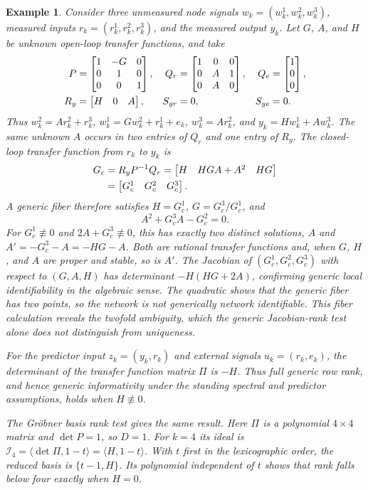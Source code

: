 \documentclass[journal,twoside,web]{ieeecolor}
\newtheorem{exmp}{Example}
\begin{document}
\begin{exmp}\label{ex:groebner-calculation}
%
Consider three unmeasured node signals $w_k=(w_k^1,w_k^2,w_k^3)$,
measured inputs $r_k=(r_k^1,r_k^2,r_k^3)$, and the measured output $y_k$.
Let $G$, $A$, and $H$ be unknown open-loop transfer functions, and take
%
\begin{align*}
P&=\begin{bmatrix} 1&-G&0\\0&1&0\\0&0&1\end{bmatrix}, &
Q_r&=\begin{bmatrix} 1&0&0\\0&A&1\\0&A&0\end{bmatrix}, &
Q_e&=\begin{bmatrix} 1\\0\\0\end{bmatrix},\\
R_y&=\begin{bmatrix} H&0&A\end{bmatrix}, &
S_{yr}&=0, & S_{ye}&=0.
\end{align*}
%
Thus $w_k^2=Ar_k^2+r_k^3$, $w_k^1=Gw_k^2+r_k^1+e_k$,
$w_k^3=Ar_k^2$, and $y_k=Hw_k^1+Aw_k^3$. The same unknown $A$
occurs in two entries of $Q_r$ and one entry of $R_y$.
The closed-loop transfer function from $r_k$ to $y_k$ is
%
\begin{align*}
G_c&=R_yP^{-1}Q_r=\begin{bmatrix} H&HGA+A^2&HG\end{bmatrix}\\
&=\begin{bmatrix} G_c^1&G_c^2&G_c^3\end{bmatrix}.
\end{align*}
%
A generic fiber therefore satisfies
$H=G_c^1$, $G=G_c^3/G_c^1$, and
%
$$A^2+G_c^3A-G_c^2=0.$$
%
For $G_c^1\not\equiv0$ and $2A+G_c^3\not\equiv0$, this has exactly two
distinct solutions, $A$ and $A'=-G_c^3-A=-HG-A$. Both are rational transfer
functions and, when $G$, $H$, and $A$ are proper and stable, so is $A'$.
The Jacobian of $(G_c^1,G_c^2,G_c^3)$ with respect to $(G,A,H)$ has
determinant $-H(HG+2A)$, confirming generic local identifiability in the
algebraic sense. The quadratic shows that the generic fiber has two points,
so the network is not generically network identifiable. This fiber calculation
reveals the twofold ambiguity, which the generic Jacobian-rank test alone
does not distinguish from uniqueness.

For the predictor input $z_k=(y_k,r_k)$ and external signals
$u_k=(r_k,e_k)$, the determinant of the transfer function matrix $\Pi$ is $-H$.
Thus full generic row rank, and hence generic informativity under the
standing spectral and predictor assumptions, holds when $H\not\equiv0$.

The Gröbner basis rank test gives the same result. Here $\Pi$ is a
polynomial $4\times4$ matrix and $\det P=1$, so $D=1$. For $k=4$ its
ideal is $\mathcal I_4=\langle\det\Pi,1-t\rangle
=\langle H,1-t\rangle$. With $t$ first in the lexicographic order,
the reduced basis is $\{t-1,H\}$. Its polynomial independent of $t$
shows that rank falls below four exactly when $H=0$.


\end{exmp}
\end{document}
